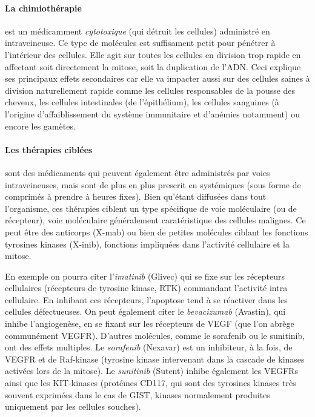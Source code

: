 \documentclass[main.tex]{subfiles}
\begin{document}
\paragraph{La chimiothérapie} est un médicamment \emph{cytotoxique} (\ie qui détruit les cellules) administré en intraveineuse. 
Ce type de molécules est suffisament petit pour pénétrer à l'intérieur des cellules. Elle agit sur toutes les cellules en division trop rapide en affectant soit directement la mitose, soit la duplication de l'ADN. Ceci explique ses principaux effets secondaires car elle va impacter aussi sur des cellules saines à division naturellement rapide comme les cellules responsables de la pousse des cheveux, les cellules intestinales (de l'épithélium), les cellules sanguines (à l'origine d'affaiblissement du système immunitaire et d'anémies notamment) ou encore les gamètes.

\paragraph{Les thérapies ciblées} sont des médicaments qui peuvent également être administrés par voies intraveineuses, mais sont de plus en plus prescrit en %
systémiques 
(\ie sous forme de comprimés à prendre à heures fixes). Bien qu'étant diffusées dans tout l'organisme, ces thérapies  ciblent un type spécifique de voie moléculaire (ou de récepteur), voie moléculaire généralement caratéristique des cellules malignes. Ce peut être des anticorps (X-mab) ou bien de petites molécules ciblant les fonctions tyrosines kinases (X-inib), fonctions impliquées dans l'activité cellulaire et la mitose. 

En exemple on pourra citer l'\emph{imatinib} (Glivec) qui se fixe sur les récepteurs cellulaires (récepteurs de tyrosine kinase, RTK) commandant l'activité intra cellulaire. En inhibant ces récepteurs, l'apoptose tend à se réactiver dans les cellules défectueuses. On peut également citer le \emph{bevacizumab} (Avastin), qui inhibe l'angiogenèse, en se fixant sur les récepteurs de VEGF (que l'on abrège communément VEGFR). D'autres molécules, comme  le sorafenib ou le sunitinib, ont des effets multiples. 
Le \emph{sorafenib} (Nexavar) est un inhibiteur, à la fois, de VEGFR et de Raf-kinase (tyrosine kinase intervenant dans la cascade de kinases activées lors de la mitose). 
Le \emph{sunitinib} (Sutent) inhibe également les VEGFRs ainsi que les KIT-kinases (protéïnes CD117, qui sont des tyrosines kinases très souvent exprimées dans le cas de GIST, kinases normalement produites uniquement par les cellules souches).
\end{document}
